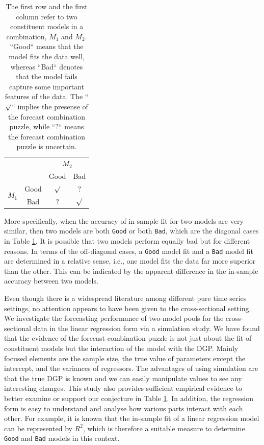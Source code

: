 \documentclass{monashthesis}
\begin{document}
\begin{table}[ht]
\centering
\begin{tabular}{cccc}
                       &      & \multicolumn{2}{c}{$M_2$} \\
                       &      & Good       & Bad       \\
\multirow{2}{*}{$M_1$} & Good & $\surd$    & $?$ \\
                       & Bad  & $?$        & $\surd$
\end{tabular}
\caption{The first row and the first column refer to two constituent models in a combination, $M_1$ and $M_2$. ``Good`` means that the model fits the data well, whereas ``Bad`` denotes that the model fails capture some important features of the data. The ``$\surd$`` implies the presense of the forecast combination puzzle, while ``$?$`` means the forecast combination puzzle is uncertain.}
\label{tab:1}
\end{table}

More specifically, when the accuracy of in-sample fit for two models are very similar, then two models are both \texttt{Good} or both \texttt{Bad}, which are the diagonal cases in Table \ref{tab:1}. It is possible that two models perform equally bad but for different reasons. In terms of the off-diagonal cases, a \texttt{Good} model fit and a \texttt{Bad} model fit are determined in a relative sense, i.e., one model fits the data far more superior than the other. This can be indicated by the apparent difference in the in-sample accuracy between two models.

Even though there is a widespread literature among different pure time series settings, no attention appears to have been given to the cross-sectional setting. We investigate the forecasting performance of two-model pools for the cross-sectional data in the linear regression form via a simulation study. We have found that the evidence of the forecast combination puzzle is not just about the fit of constituent models but the interaction of the model with the DGP. Mainly focused elements are the sample size, the true value of parameters except the intercept, and the variances of regressors. The advantages of using simulation are that the true DGP is known and we can easily manipulate values to see any interesting changes. This study also provides sufficient empirical evidence to better examine or support our conjecture in Table \ref{tab:1}. In addition, the regression form is easy to understand and analyse how various parts interact with each other. For example, it is known that the in-sample fit of a linear regression model can be represented by \(R^2\), which is therefore a suitable measure to determine \texttt{Good} and \texttt{Bad} models in this context.
\end{document}
